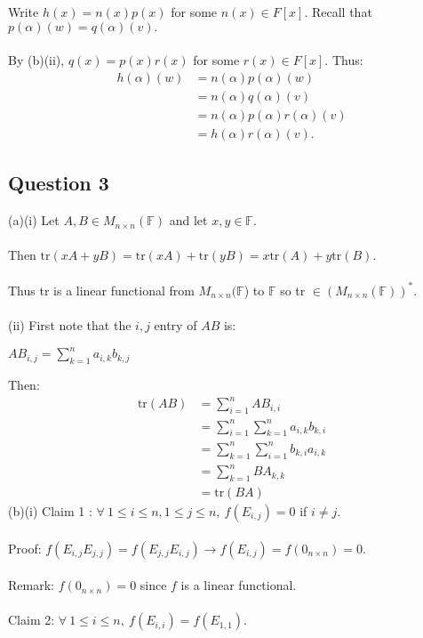 \documentclass{article}
\begin{document}
 Write $h(x) = n(x)p(x)$ for some $n(x) \in F[x].$ Recall that $p(\alpha)(w) = q(\alpha)(v).$\\\\
By (b)(ii), $q(x) = p(x)r(x)$ for some $r(x) \in F[x].$ Thus:\begin{align*}
 h(\alpha)(w) &= n(\alpha)p(\alpha)(w)\\ &= n(\alpha)q(\alpha)(v)\\ &= n(\alpha)p(\alpha)r(\alpha)(v)\\ &= h(\alpha)r(\alpha)(v).
\end{align*}
\subsection*{Question 3}
(a)(i) Let $A,B\in M_{n\times n}(\mathbb{F})$ and let $x,y\in \mathbb{F}.$\\\\
Then $\text{tr}(xA+yB) = \text{tr}(xA) + \text{tr}(yB) = x\text{tr}(A) + y\text{tr}(B).$\\\\
Thus tr is a linear functional from $M_{n\times n}(\mathbb{F}$) to $\mathbb{F}$ so tr $\in (M_{n\times n}(\mathbb{F}))^*.$\\\\
(ii) First note that the $i,j$ entry of $AB$ is:\begin{center}
$AB_{i,j} = \sum\limits_{k=1}^{n} a_{i,k}b_{k,j}$
\end{center}
Then: \begin{align*}
    \text{tr}(AB) &= \sum\limits_{i=1}^n AB_{i,i}\\ &= \sum\limits_{i=1}^n \sum\limits_{k=1}^n a_{i,k}b_{k,i}\\ &= \sum\limits_{k=1}^n \sum\limits_{i=1}^n b_{k,i}a_{i,k}\\ &= \sum\limits_{k=1}^n BA_{k,k}\\ &= \text{tr}(BA)
\end{align*}
(b)(i) Claim 1 : $\forall\ 1\leq i \leq n, 1\leq j \leq n,\ f(E_{i,j}) = 0$ if $i\neq j$.\\\\
Proof: $f(E_{i,j}E_{j,j}) = f(E_{j,j}E_{i,j}) \to f(E_{i,j}) = f(0_{n\times n}) = 0.$\\\\
Remark: $f(0_{n\times n}) = 0$ since $f$ is a linear functional.\\\\
Claim 2: $\forall\ 1\leq i \leq n,\ f(E_{i,i}) = f(E_{1,1}).$\\\\
\end{document}
